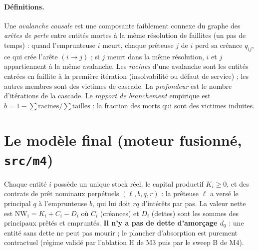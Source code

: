 \documentclass[11pt,a4paper]{article}
\newcommand{\NW}{\mathrm{NW}}
\newcommand{\code}[1]{\texttt{#1}}
\begin{document}
\paragraph{Définitions.} Une \emph{avalanche causale} est une composante
faiblement connexe du graphe des \emph{arêtes de perte} entre entités mortes
à la même résolution de faillites (un pas de temps) : quand l'emprunteuse
$i$ meurt, chaque prêteuse $j$ de $i$ perd sa créance $q_{ij}$, ce qui crée
l'arête $(i \to j)$ ; si $j$ meurt dans la même résolution, $i$ et $j$
appartiennent à la même avalanche. Les \emph{racines} d'une avalanche sont
les entités entrées en faillite à la première itération (insolvabilité ou
défaut de service) ; les autres membres sont des victimes de cascade. La
\emph{profondeur} est le nombre d'itérations de la cascade. Le
\emph{rapport de branchement} empirique est
$b = 1 - \sum \text{racines} / \sum \text{tailles}$ : la fraction des morts
qui sont des victimes induites.

\section{Le modèle final (moteur fusionné, \code{src/m4})}

Chaque entité $i$ possède un unique stock réel, le capital productif
$K_i \ge 0$, et des contrats de prêt nominaux perpétuels $(\ell, b, q, r)$ :
la prêteuse $\ell$ a versé le principal $q$ à l'emprunteuse $b$, qui lui doit
$r q$ d'intérêts par pas. La valeur nette est
$\NW_i = K_i + C_i - D_i$ où $C_i$ (créances) et $D_i$ (dettes) sont les
sommes des principaux prêtés et empruntés. \textbf{Il n'y a pas de dette
d'amorçage $d_0$} : une entité sans dette ne peut pas mourir ; le plancher
d'absorption est purement contractuel (régime validé par l'ablation H de M3
puis par le sweep B de M4).
\end{document}
